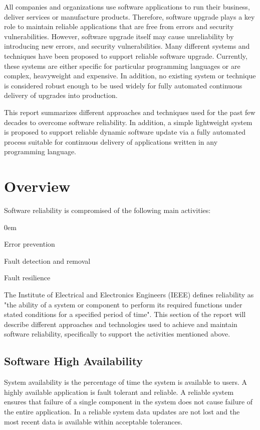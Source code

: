 \documentclass[a4paper,11pt,twoside]{article}
\begin{document}
All companies and organizations use software applications to run their business, deliver services or manufacture products. Therefore, software upgrade plays a key role to maintain reliable applications that are free from errors and security vulnerabilities. However, software upgrade itself may cause unreliability by introducing new errors, and security vulnerabilities. Many different systems and techniques have been proposed to support reliable software upgrade. Currently, these systems are either specific for particular programming languages or are complex, heavyweight and expensive. In addition, no existing system or technique is considered robust enough to be used widely for fully automated continuous delivery of upgrades into production.
 
This report summarizes different approaches and techniques used for the past few decades to overcome software reliability. In addition, a simple lightweight system is proposed to support reliable dynamic software update via a fully automated process suitable for continuous delivery of applications written in any programming language.\\  


\clearpage
\section{Overview}
Software reliability is compromised of the following main activities:

  \begin{list}{-}{}
  \itemsep0em
  \item Error prevention 
  
  \item Fault detection and removal
  
  \item Fault resilience
  \end{list}

\noindent
The Institute of Electrical and Electronics Engineers (IEEE) defines reliability as "the ability of a system or component to perform its required functions under stated conditions for a specified period of time". 
This section of the report will describe different approaches and technologies used to achieve and maintain software reliability, specifically to support the activities mentioned above. 

\subsection{Software High Availability }\label{subsec:rules}
System availability is the percentage of time the system is available to users. A highly available application is fault tolerant and reliable. A reliable system ensures that failure of a single component in the system does not cause failure of the entire application. In a reliable system data updates are not lost and the most recent data is available within acceptable tolerances. 
\end{document}
